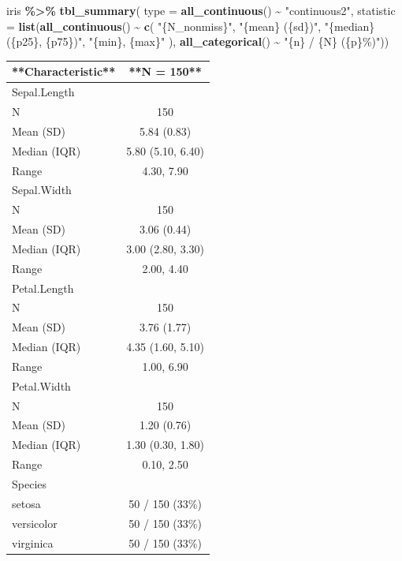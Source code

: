 \documentclass[
]{book}
\newenvironment{Shaded}{\begin{snugshade}}{\end{snugshade}}
\newcommand{\AttributeTok}[1]{\textcolor[rgb]{0.13,0.29,0.53}{#1}}
\newcommand{\FunctionTok}[1]{\textcolor[rgb]{0.13,0.29,0.53}{\textbf{#1}}}
\newcommand{\NormalTok}[1]{#1}
\newcommand{\SpecialCharTok}[1]{\textcolor[rgb]{0.81,0.36,0.00}{\textbf{#1}}}
\newcommand{\StringTok}[1]{\textcolor[rgb]{0.31,0.60,0.02}{#1}}
\begin{document}
\begin{Shaded}
\begin{Highlighting}[]
\NormalTok{iris }\SpecialCharTok{\%\textgreater{}\%}
  \FunctionTok{tbl\_summary}\NormalTok{(}
    \AttributeTok{type =} \FunctionTok{all\_continuous}\NormalTok{() }\SpecialCharTok{\textasciitilde{}} \StringTok{"continuous2"}\NormalTok{,}
    \AttributeTok{statistic =} \FunctionTok{list}\NormalTok{(}\FunctionTok{all\_continuous}\NormalTok{() }\SpecialCharTok{\textasciitilde{}} \FunctionTok{c}\NormalTok{(}
      \StringTok{"\{N\_nonmiss\}"}\NormalTok{,}
      \StringTok{"\{mean\} (\{sd\})"}\NormalTok{,}
      \StringTok{"\{median\} (\{p25\}, \{p75\})"}\NormalTok{,}
      \StringTok{"\{min\}, \{max\}"}
\NormalTok{    ), }\FunctionTok{all\_categorical}\NormalTok{() }\SpecialCharTok{\textasciitilde{}} \StringTok{"\{n\} / \{N\} (\{p\}\%)"}\NormalTok{))}
\end{Highlighting}
\end{Shaded}

\begin{tabular}{l|c}
\hline
**Characteristic** & **N = 150**\\
\hline
Sepal.Length & \\
\hline
N & 150\\
\hline
Mean (SD) & 5.84 (0.83)\\
\hline
Median (IQR) & 5.80 (5.10, 6.40)\\
\hline
Range & 4.30, 7.90\\
\hline
Sepal.Width & \\
\hline
N & 150\\
\hline
Mean (SD) & 3.06 (0.44)\\
\hline
Median (IQR) & 3.00 (2.80, 3.30)\\
\hline
Range & 2.00, 4.40\\
\hline
Petal.Length & \\
\hline
N & 150\\
\hline
Mean (SD) & 3.76 (1.77)\\
\hline
Median (IQR) & 4.35 (1.60, 5.10)\\
\hline
Range & 1.00, 6.90\\
\hline
Petal.Width & \\
\hline
N & 150\\
\hline
Mean (SD) & 1.20 (0.76)\\
\hline
Median (IQR) & 1.30 (0.30, 1.80)\\
\hline
Range & 0.10, 2.50\\
\hline
Species & \\
\hline
setosa & 50 / 150 (33\%)\\
\hline
versicolor & 50 / 150 (33\%)\\
\hline
virginica & 50 / 150 (33\%)\\
\hline
\end{tabular}
\end{document}
